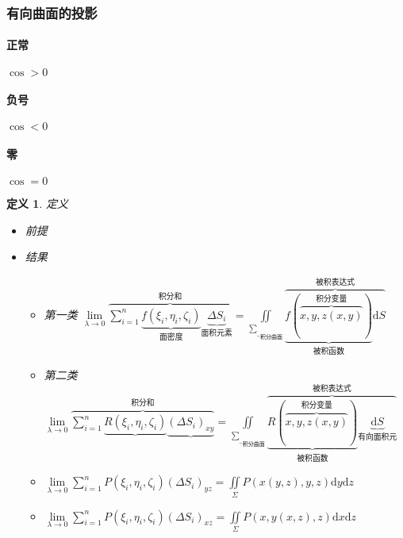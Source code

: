 \documentclass[UTF8,a4paper,12pt,scheme=chinese]{ctexbook}
\newcommand{\ud}{\mathrm{d}}
\theoremstyle{plain}
\newtheorem{definition}{定义}[section]
\begin{document}
	\subsubsection{有向曲面的投影}
	\paragraph{正常}$ \cos>0 $
	\paragraph{负号}$ \cos<0 $
	\paragraph{零}$ \cos=0 $
	\begin{definition}
		定义\begin{itemize}
			\item 前提
			\item 结果
			\begin{itemize}
				\item 第一类\quad
				$ \lim\limits_{\lambda\rightarrow 0}
				\overbrace{\sum_{i=1}^{n}
					\underbrace{f(\xi_i,\eta_i,\zeta _i)}
					_{\mbox{面密度}}
					\underbrace{\Delta S_i}
					_{\mbox{面积元素}}}
				^{\mbox{积分和}}
				=\iint\limits_{
					\underbrace{\scriptstyle\sum}
					_{\mbox{积分曲面}}
				}
				\overbrace{
					\underbrace{f(
						\overbrace{x,y,z(x,y)}
						^{\mbox{积分变量}}
						)}
					_{\mbox{被积函数}}
					\ud S}
				^{\mbox{被积表达式}}
				$
				\item 第二类\quad
				$ \lim\limits_{\lambda\rightarrow 0}
				\overbrace{\sum_{i=1}^{n}
					\underbrace{R(\xi_i,\eta_i,\zeta _i)}
					_{\mbox{}}
					\underbrace{(\Delta S_i)_{xy}}
					_{\mbox{}}}
				^{\mbox{积分和}}
				=\iint\limits_{
					\underbrace{\scriptstyle\sum}
					_{\mbox{积分曲面}}
				}
				\overbrace{
					\underbrace{R(
						\overbrace{x,y,z(x,y)}
						^{\mbox{积分变量}}
						)}
					_{\mbox{被积函数}}
					\underbrace{\ud S}
					_{\mbox{有向面积元}}
				}
				^{\mbox{被积表达式}}
				$
				\item $\lim\limits_{\lambda  \to 0} \sum\limits_{i = 1}^n {P(\xi_i,\eta_i,\zeta_i){{(\Delta S_i)}_{yz}}}
				=
				\iint\limits_\Sigma  {P(x(y,z),y,z)\ud y\ud z} $
				\item $\lim\limits_{\lambda  \to 0} \sum\limits_{i = 1}^n {P(\xi_i,\eta_i,\zeta_i){{(\Delta S_i)}_{xz}}}
				=
				\iint\limits_\Sigma  {P(x,y(x,z),z)\ud x\ud z} $
			\end{itemize}
		\end{itemize}
	\end{definition}
\end{document}
